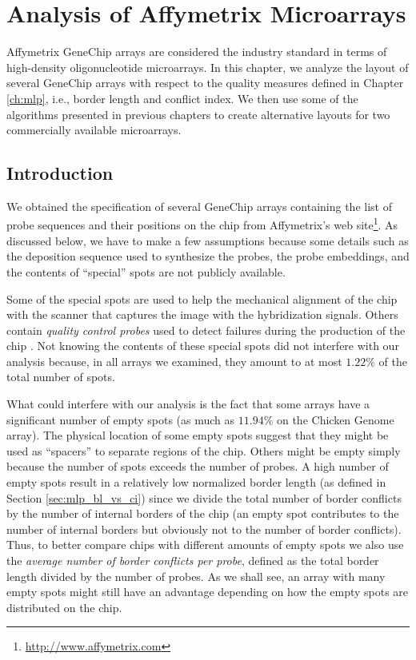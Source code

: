 \chapter{Analysis of Affymetrix Microarrays}
\label{ch:affy}

Affymetrix GeneChip arrays are considered the industry standard in terms of
high-density oligonucleotide microarrays. In this chapter, we analyze the layout
of several GeneChip arrays with respect to the quality measures defined in
Chapter \ref{ch:mlp}, i.e., border length and conflict index. We then use some
of the algorithms presented in previous chapters to create alternative layouts
for two commercially available microarrays.

\section{Introduction}
\label{sec:affy_intro}

We obtained the specification of several GeneChip arrays containing the list of
probe sequences and their positions on the chip from Affymetrix's web
site\footnote{\url{http://www.affymetrix.com}}. As discussed below, we have to
make a few assumptions because some details such as the deposition sequence used
to synthesize the probes, the probe embeddings, and the contents of ``special''
spots are not publicly available.

Some of the special spots are used to help the mechanical alignment of the chip
with the scanner that captures the image with the hybridization signals. Others
contain \emph{quality control probes} used to detect failures during the
production of the chip \citep{Affymetrix2002,Hubbell1999a}. Not knowing the
contents of these special spots did not interfere with our analysis because, in
all arrays we examined, they amount to at most $1.22\%$ of the total number of
spots.

What could interfere with our analysis is the fact that some arrays have a
significant number of empty spots (as much as $11.94\%$ on the Chicken Genome
array). The physical location of some empty spots suggest that they might be
used as ``spacers'' to separate regions of the chip. Others might be empty
simply because the number of spots exceeds the number of probes. A high number
of empty spots result in a relatively low normalized border length (as defined
in Section \ref{sec:mlp_bl_vs_ci}) since we divide the total number of border
conflicts by the number of internal borders of the chip (an empty spot
contributes to the number of internal borders but obviously not to the number of
border conflicts). Thus, to better compare chips with different amounts of empty
spots we also use the \emph{average number of border conflicts per probe},
defined as the total border length divided by the number of probes. As we shall
see, an array with many empty spots might still have an advantage depending on
how the empty spots are distributed on the chip.

